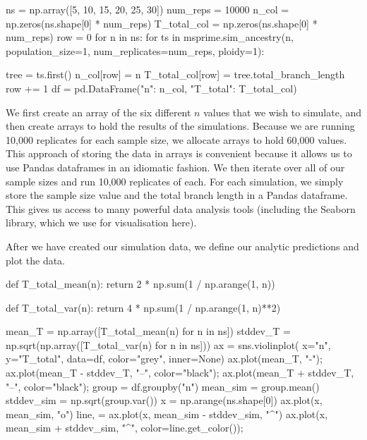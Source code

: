 \documentclass[graybox]{svmult}
\begin{document}
\begin{pythoncode}
ns = np.array([5, 10, 15, 20, 25, 30])
num_reps = 10000
n_col = np.zeros(ns.shape[0] * num_reps)
T_total_col = np.zeros(ns.shape[0] * num_reps)
row = 0
for n in ns:
    for ts in msprime.sim_ancestry(n, population_size=1, num_replicates=num_reps, ploidy=1):

        tree = ts.first()
        n_col[row] = n
        T_total_col[row] = tree.total_branch_length
        row += 1
df = pd.DataFrame({"n": n_col, "T_total": T_total_col})
\end{pythoncode}

    We first create an array of the six different \(n\) values that we wish to simulate, and then create arrays to hold the results of the
simulations. Because we are running 10,000 replicates for each sample
size, we allocate arrays to hold 60,000 values. This approach of storing
the data in arrays is convenient because it allows us to use Pandas
dataframes in an idiomatic fashion. We then iterate
over all of our sample sizes and run 10,000 replicates of each. For each
simulation, we simply store the sample size value and the total branch
length in a Pandas dataframe. This gives us access to many powerful data analysis tools (including the Seaborn library, which we use for visualisation here).

After we have created our simulation data, we define our analytic
predictions and plot the data.

\begin{pythoncode}
def T_total_mean(n):
    return 2 * np.sum(1 / np.arange(1, n))

def T_total_var(n):
    return 4 * np.sum(1 / np.arange(1, n)**2)

mean_T = np.array([T_total_mean(n) for n in ns])
stddev_T = np.sqrt(np.array([T_total_var(n) for n in ns]))
ax = sns.violinplot(
    x="n", y="T_total", data=df, color="grey", inner=None)
ax.plot(mean_T, "-");
ax.plot(mean_T - stddev_T, "--", color="black");
ax.plot(mean_T + stddev_T, "--", color="black");
group = df.groupby("n")
mean_sim = group.mean()
stddev_sim = np.sqrt(group.var())
x = np.arange(ns.shape[0])
ax.plot(x, mean_sim, "o")
line, = ax.plot(x, mean_sim - stddev_sim, "^")
ax.plot(x, mean_sim + stddev_sim, "^", color=line.get_color());
\end{pythoncode}
\end{document}
